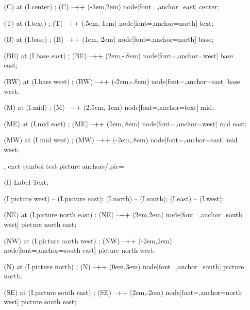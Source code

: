 {{     (C) at (I.center) {};
     (C) --++ (-3em,2em) node[font=\tiny,anchor=east] {center};

     (T) at (I.text) {};
     (T) --++ (.5em,-1em) node[font=\tiny,anchor=north] {text};

     (B) at (I.base) {};
     (B) --++ (1em,-2em) node[font=\tiny,anchor=north] {base};

     (BE) at (I.base east) {};
     (BE) --++ (2em,-.8em) node[font=\tiny,anchor=west] {base east};

     (BW) at (I.base west) {};
     (BW) --++ (-2em,-.8em) node[font=\tiny,anchor=east] {base west};

     (M) at (I.mid) {};
     (M) --++ (2.5em, 1em) node[font=\tiny,anchor=text] {mid};

     (ME) at (I.mid east) {};
     (ME) --++ (2em,.8em) node[font=\tiny,anchor=west] {mid east};

     (MW) at (I.mid west) {};
     (MW) --++ (-2em,.8em) node[font=\tiny,anchor=east] {mid west};
  },
  cnet symbol test picture anchors/.pic={
     (I) {Label Text};

     (I.picture west) -- (I.picture east);
     (I.north) -- (I.south);
     (I.east) -- (I.west);

     (NE) at (I.picture north east) {};
     (NE) --++ (2em,2em) node[font=\tiny,anchor=south west] {picture north east};

     (NW) at (I.picture north west) {};
     (NW) --++ (-2em,2em) node[font=\tiny,anchor=south east] {picture north west};

     (N) at (I.picture north) {};
     (N) --++ (0em,3em) node[font=\tiny,anchor=south] {picture north};

     (SE) at (I.picture south east) {};
     (SE) --++ (2em,-2em) node[font=\tiny,anchor=north west] {picture south east};

}}

